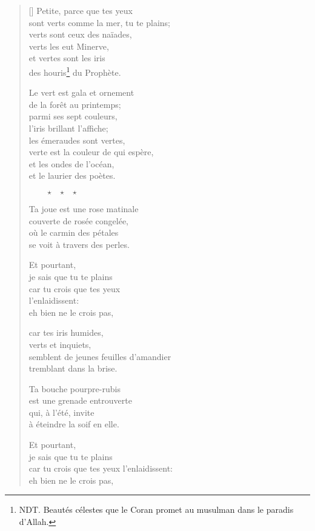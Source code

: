 \documentclass[a4paper,12pt]{book}
\begin{document}
\begin{verse}[\versewidth]
  Petite, parce que tes yeux \\
  sont verts comme la mer, tu te plains; \\
  verts sont ceux des naïades, \\
  verts les eut Minerve, \\
  et vertes sont les iris \\
  des houris\footnote{NDT. Beautés célestes que le Coran promet au musulman dans le paradis d'Allah.} du Prophète.

  Le vert est gala et ornement \\
  de la forêt au printemps; \\
  parmi ses sept couleurs, \\
  l'iris brillant l'affiche; \\
  les émeraudes sont vertes, \\
  verte est la couleur de qui espère, \\
  et les ondes de l'océan, \\
  et le laurier des poètes.

  $\ \ \ \ \ \ \ \ \ \star \ \ \ \star \ \ \ \star$

  Ta joue est une rose matinale \\
  couverte de rosée congelée, \\
  où le carmin des pétales \\
  se voit à travers des perles.

  Et pourtant, \\
  je sais que tu te plains \\
  car tu crois que tes yeux \\
  l'enlaidissent: \\
  eh bien ne le crois pas,

  car tes iris humides, \\
  verts et inquiets, \\
  semblent de jeunes feuilles d'amandier \\
  tremblant dans la brise.

  Ta bouche pourpre-rubis \\
  est une grenade entrouverte \\
  qui, à l'été, invite \\
  à éteindre la soif en elle.

  Et pourtant, \\
  je sais que tu te plains \\
  car tu crois que tes yeux
  l'enlaidissent: \\
  eh bien ne le crois pas,


\end{verse}
\end{document}
